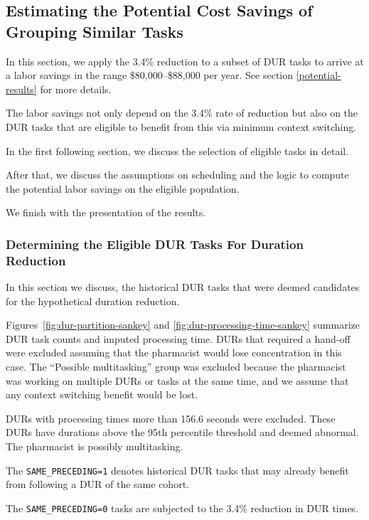 \subsection{Estimating the Potential Cost Savings of Grouping Similar Tasks}\label{estimating-potential-cost-savings}
In this section, we apply the 3.4\% reduction to a subset of DUR tasks
to arrive at a labor savings in the range \$80,000--\$88,000 per
year. See section \ref{potential-results} for more details.

The labor savings not only depend on the 3.4\% rate of reduction but
also on the DUR tasks that are eligible to benefit from this via
minimum context switching.

In the first following section, we discuss the selection of eligible tasks
in detail.

After that, we discuss the assumptions on scheduling and the logic to
compute the potential labor savings on the eligible population.

We finish with the presentation of the results.

\subsubsection{Determining the Eligible DUR Tasks For Duration Reduction}
In this section we discuss, the historical DUR tasks that were deemed
candidates for the hypothetical duration reduction.

Figures~\ref{fig:dur-partition-sankey} and
\ref{fig:dur-processing-time-sankey} summarize DUR task counts and
imputed processing time. DURs that required a hand-off were excluded
assuming that the pharmacist would lose concentration in this
case. The ``Possible multitasking'' group was excluded because the
pharmacist was working on multiple DURs or tasks at the same time, and
we assume that any context switching benefit would be lost.

DURs with processing times more than 156.6 seconds were
excluded. These DURs have durations above the 95th percentile
threshold and deemed abnormal. The pharmacist is possibly
multitasking.

The \texttt{SAME\_PRECEDING=1} denotes historical DUR tasks that may already
benefit from following a DUR of the same cohort.

The \texttt{SAME\_PRECEDING=0} tasks are subjected to the 3.4\% reduction in
DUR times.


